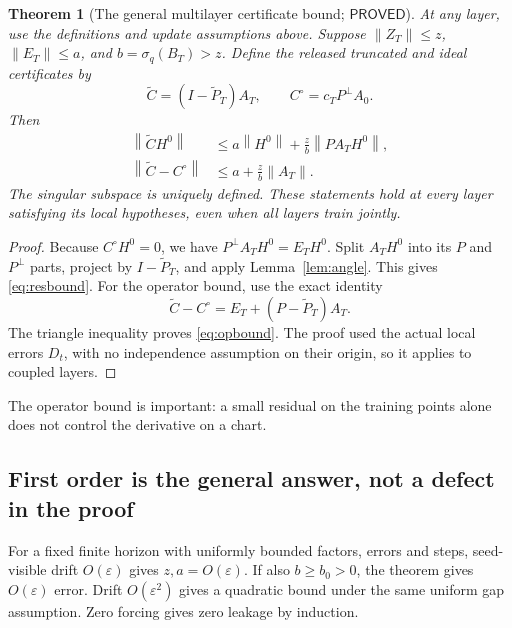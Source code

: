 \documentclass[12pt,a4paper]{article}
\theoremstyle{readable}
\newtheorem{theorem}{Theorem}[section]
\theoremstyle{definition}\newtheorem{example}[theorem]{Example}
\newcommand{\norm}[1]{\left\|#1\right\|}
\newcommand{\PP}{\mathsf{PROVED}}\newcommand{\FF}{\mathsf{FALSE}}
\begin{document}
\begin{theorem}[The general multilayer certificate bound; \(\PP\)]\label{thm:perturb}
At any layer, use the definitions and update assumptions above. Suppose
\(\norm{Z_T}\le z\), \(\norm{E_T}\le a\), and \(b=\sigma_q(B_T)>z\).
Define the released truncated and ideal certificates by
\[
\widetilde C=(I-\widetilde P_T)A_T,
\qquad C^\circ=c_TP^\perp A_0.
\]
Then
\begin{align}
\norm{\widetilde C H^0}
&\le a\norm{H^0}+\frac zb\norm{PA_TH^0},\label{eq:resbound}\\
\norm{\widetilde C-C^\circ}
&\le a+\frac zb\norm{A_T}.\label{eq:opbound}
\end{align}
The singular subspace is uniquely defined. These statements hold at every layer satisfying its local hypotheses, even when all layers train jointly.
\end{theorem}
\begin{proof}
Because \(C^\circ H^0=0\), we have \(P^\perp A_TH^0=E_TH^0\). Split \(A_TH^0\) into its \(P\) and \(P^\perp\) parts, project by \(I-\widetilde P_T\), and apply Lemma~\ref{lem:angle}. This gives \eqref{eq:resbound}. For the operator bound, use the exact identity
\[
\widetilde C-C^\circ=E_T+(P-\widetilde P_T)A_T.
\]
The triangle inequality proves \eqref{eq:opbound}. The proof used the actual local errors \(D_t\), with no independence assumption on their origin, so it applies to coupled layers.
\end{proof}
The operator bound is important: a small residual on the training points alone does not control the derivative on a chart.

\subsection{First order is the general answer, not a defect in the proof}
For a fixed finite horizon with uniformly bounded factors, errors and steps, seed-visible drift \(O(\varepsilon)\) gives \(z,a=O(\varepsilon)\). If also \(b\ge b_0>0\), the theorem gives \(O(\varepsilon)\) error. Drift \(O(\varepsilon^2)\) gives a quadratic bound under the same uniform gap assumption. Zero forcing gives zero leakage by induction.
\end{document}
